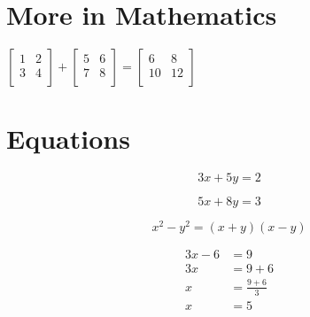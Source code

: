 \documentclass{article}
\begin{document}
	\section{More in Mathematics}
	
	$
	\begin{bmatrix}
	1 & 2 \\
	3 & 4 \\
	\end{bmatrix}
	+
	\begin{bmatrix}
	5 & 6 \\
	7 & 8 \\
	\end{bmatrix}
	=
	\begin{bmatrix}
	6 & 8 \\
	10 & 12 \\
	\end{bmatrix}
	$
	
	\section{Equations}
	\begin{equation}
	3x + 5y = 2
	\end{equation}
	
	\begin{equation}
	5x + 8y = 3
	\end{equation}
	
	\begin{equation}
	x^{2} - y^{2} = (x+y) (x-y)
	\end{equation}
	
	\begin{align}
	3x - 6 &= 9 \\
	3x &= 9 + 6 \nonumber \\
	x &= \frac{9+6}{3} \nonumber \\
	x &= 5 \nonumber
	\end{align}
	
\end{document}
